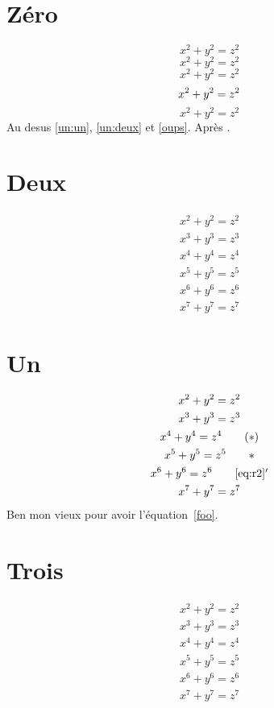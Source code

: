 \documentclass{article}
\numberwithin{equation}{section}
\renewcommand{\theequation}{\thesection.\alph{equation}}
\begin{document}
\section{Z\'ero}

\begin{equation}
x^2+y^2 = z^2\label{un:un}
\end{equation}
\begin{equation*}
x^2+y^2 = z^2
\end{equation*}
\begin{equation}
x^2+y^2 = z^2\label{un:deux}
\end{equation}
\begin{equation}
x^2+y^2 = z^2\notag
\end{equation}
\begin{equation*}
\tag{oups}x^2+y^2 = z^2\label{oups}
\end{equation*}
Au desus \ref{un:un}, \ref{un:deux} et \ref{oups}.
Apr\`es
\theequation

\section{Deux}
\begin{gather}
x^2+y^2 = z^2\\
x^3+y^3 = z^3\\
x^4+y^4 = z^4\\
x^5+y^5 = z^5\\
x^6+y^6 = z^6\\
x^7+y^7 = z^7
\end{gather}

\section{Un}
\begin{gather}
x^2+y^2 = z^2 \label{eq:r2}\\
x^3+y^3 = z^3 \notag\\
x^4+y^4 = z^4 \tag{$*$}\label{foo}\\
x^5+y^5 = z^5 \tag*{$*$}\\
x^6+y^6 = z^6 \tag*{\ref{eq:r2}$'$}\\
x^7+y^7 = z^7
\end{gather}
Ben mon vieux pour avoir l'\'equation~\ref{foo}.

\section{Trois}
\begin{gather*}
x^2+y^2 = z^2\tag{$+$}\\
x^3+y^3 = z^3\\
x^4+y^4 = z^4\\
x^5+y^5 = z^5\\
x^6+y^6 = z^6\\
x^7+y^7 = z^7
\end{gather*}
\end{document}
